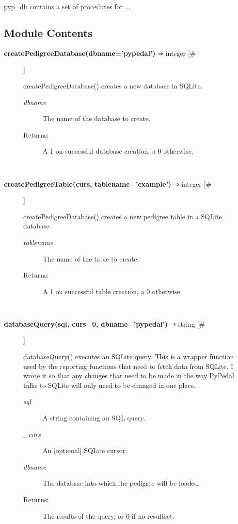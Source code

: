 

 pyp\_db contains a set of procedures for ...
\subsection*{Module Contents}
\begin{description}
\item[\textbf{createPedigreeDatabase(dbname='pypedal')}
 ⇒ integer [\#]]

 createPedigreeDatabase() creates a new database in SQLite.
\begin{description}
\item[\emph{dbname}
] The name of the database to create.
\item[Returns:] A 1 on successful database creation, a 0 otherwise.

\end{description}
\\ 

\item[\textbf{createPedigreeTable(curs, tablename='example')}
 ⇒ integer [\#]]

 createPedigreeDatabase() creates a new pedigree table in a SQLite database.
\begin{description}
\item[\emph{tablename}
] The name of the table to create.
\item[Returns:] A 1 on successful table creation, a 0 otherwise.

\end{description}
\\ 

\item[\textbf{databaseQuery(sql, curs=0, dbname='pypedal')}
 ⇒ string [\#]]

 databaseQuery() executes an SQLite query. This is a wrapper function used by the reporting functions that need to fetch data from SQLite. I wrote it so that any changes that need to be made in the way PyPedal talks to SQLite will only need to be changed in one place.
\begin{description}
\item[\emph{sql}
] A string containing an SQL query.
\item[\emph{\_curs}
] An [optional] SQLite cursor.
\item[\emph{dbname}
] The database into which the pedigree will be loaded.
\item[Returns:] The results of the query, or 0 if no resultset.


\end{description}
\end{description}
